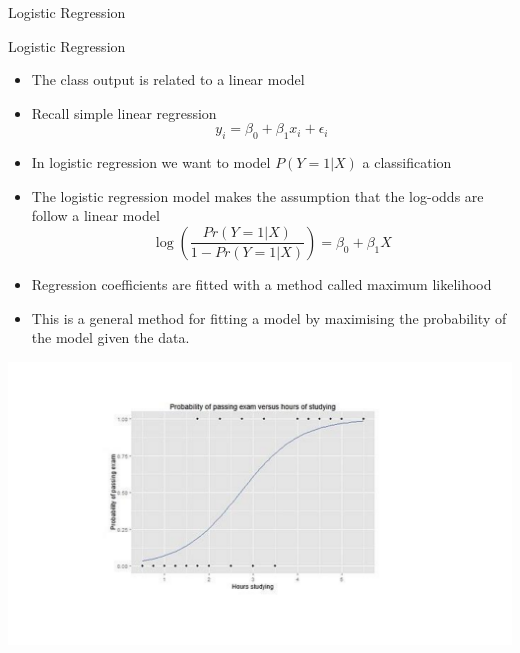 \documentclass{bredelebeamer}
\begin{document}
\begin{frame}{Logistic Regression}

\begin{exampleblock}{Logistic Regression}
	
	\begin{itemize}
		\item The class output is related to a linear model
		\item Recall simple linear regression
		\begin{equation}
		y_i = \beta_0 + \beta_1x_i + \epsilon_i
		\end{equation}
		\item In logistic regression we want to model $P(Y = 1|X)$ a classification
		\item The logistic regression model makes the assumption that the log-odds are follow a linear model
		\begin{equation}
		\log\left(\frac{Pr(Y = 1|X)}{1 - Pr(Y = 1|X)}\right) = \beta_0 + \beta_1 X
		\end{equation}
		\item Regression coefficients are fitted with a method called maximum likelihood
		\item This is a general method for fitting a model by maximising the probability of the model given the data.
	\end{itemize}
	
\end{exampleblock}

\end{frame}

\begin{frame}
\includegraphics[width = 1\textwidth]{logistic}
\end{frame}
\end{document}
